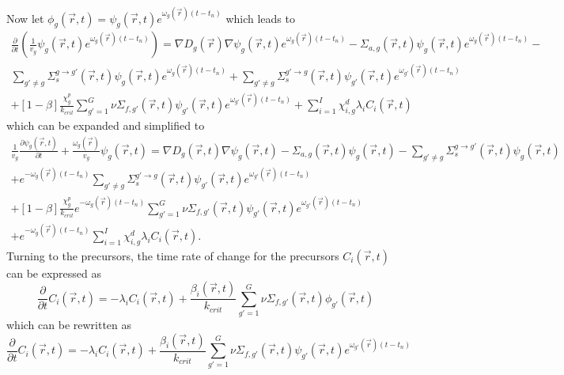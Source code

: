 \documentclass[12pt]{report}
\begin{document}
	Now let $\phi_g(\vec{r},t) = \psi_g(\vec{r},t) e^{\omega_g(\vec{r}) (t-t_n)}$ which leads to
	\begin{eqnarray}
	\frac{\partial}{\partial t} \left( \frac{1}{v_g} \psi_g(\vec{r},t) e^{\omega_g(\vec{r}) (t-t_n)} \right) = \nabla D_g(\vec{r}) \nabla \psi_g(\vec{r},t) e^{\omega_g(\vec{r}) (t-t_n)}  - \Sigma_{a,g}(\vec{r},t) \psi_g(\vec{r},t) e^{\omega_g(\vec{r}) (t-t_n)} - \nonumber \\ \sum_{g'\neq g} \Sigma_{s}^{g\rightarrow g'} (\vec{r},t) \psi_g(\vec{r},t) e^{\omega_g(\vec{r}) (t-t_n)}    + \sum_{g' \neq g} \Sigma_{s}^{g'\rightarrow g} (\vec{r},t) \psi_{g'}(\vec{r},t) e^{\omega_{g'}(\vec{r}) (t-t_n)} \nonumber \\
	+ \left[ 1- \beta \right] \frac{\chi_g^p}{k_{crit}} \sum_{g'=1}^{G} \nu \Sigma_{f,g'}(\vec{r},t) \psi_{g'}(\vec{r},t) e^{\omega_{g'}(\vec{r}) (t-t_n)} + \sum_{i=1}^{I} \chi_{i,g}^d \lambda_i C_i(\vec{r},t) \nonumber
	\end{eqnarray}
	which can be expanded and simplified to
	\begin{eqnarray}
	\frac{1}{v_g} \frac{\partial \psi_g(\vec{r},t)}{\partial t} + \frac{\omega_g(\vec{r})}{v_g} \psi_g(\vec{r},t)  = \nabla D_g(\vec{r},t) \nabla \psi_g(\vec{r},t) - \Sigma_{a,g}(\vec{r},t) \psi_g(\vec{r},t) -  \sum_{g'\neq g} \Sigma_{s}^{g\rightarrow g'} (\vec{r},t) \psi_g(\vec{r},t) \nonumber \\ + e^{-\omega_g(\vec{r}) (t-t_n)} \sum_{g' \neq g} \Sigma_{s}^{g'\rightarrow g} (\vec{r},t) \psi_{g'}(\vec{r},t) e^{\omega_{g'}(\vec{r}) (t-t_n)} \nonumber \\
	+ \left[ 1- \beta \right] \frac{\chi_g^p}{k_{crit}} e^{-\omega_g(\vec{r}) (t-t_n)} \sum_{g'=1}^{G} \nu \Sigma_{f,g'}(\vec{r},t) \psi_{g'}(\vec{r},t) e^{\omega_{g'}(\vec{r}) (t-t_n)} \nonumber \\ + e^{-\omega_g(\vec{r}) (t-t_n)} \sum_{i=1}^{I} \chi_{i,g}^d \lambda_i C_i(\vec{r},t) \nonumber.
	\end{eqnarray}
	Turning to the precursors, the time rate of change for the precursors $C_i(\vec{r},t)$ can be expressed as
	\begin{equation}
	\frac{\partial}{\partial t} C_i(\vec{r},t) = -\lambda_i C_i(\vec{r},t) + \frac{\beta_i(\vec{r},t)}{k_{crit}} \sum_{g'=1}^{G} \nu \Sigma_{f,g'}(\vec{r},t) \phi_{g'}(\vec{r},t) \nonumber
	\end{equation}
	which can be rewritten as
	\begin{equation}
	\frac{\partial}{\partial t} C_i(\vec{r},t) = -\lambda_i C_i(\vec{r},t) + \frac{\beta_i(\vec{r},t)}{k_{crit}} \sum_{g'=1}^{G} \nu \Sigma_{f,g'}(\vec{r},t) \psi_{g'}(\vec{r},t) e^{\omega_{g'}(\vec{r}) (t-t_n)} \nonumber
	\end{equation}
\end{document}
